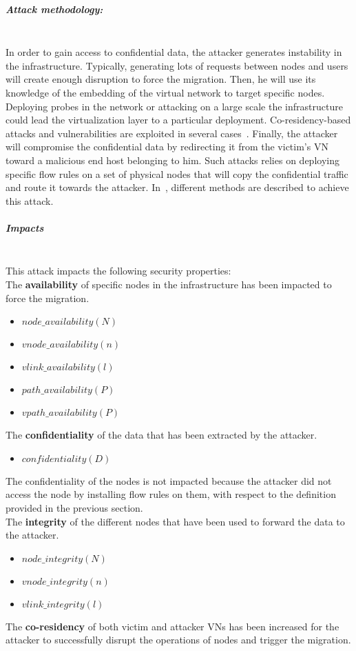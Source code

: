 \subparagraph{Attack methodology:}\textbf{\\}
In order to gain access to confidential data, the attacker generates instability in the infrastructure. Typically, generating lots of requests between nodes and users will create enough disruption to force the migration.
Then, he will use its knowledge of the embedding of the virtual network to target specific nodes.
Deploying probes in the network or attacking on a large scale the infrastructure could lead the virtualization layer to a particular deployment. Co-residency-based attacks and vulnerabilities are exploited in several cases~\cite{malicious-atya2017,nomad-Moon2015b,getoffmucloud-Ristenpart2009,stalling-atya2017}.
Finally, the attacker will compromise the confidential data by redirecting it from the victim's VN toward a malicious end host belonging to him.
Such attacks relies on deploying specific flow rules on a set of physical nodes that will copy the confidential traffic and route it towards the attacker.
In~\cite{Costa2015,Sphinx-Dhawan2015}, different methods are described to achieve this attack. 

\subparagraph{Impacts}\textbf{\\}
This attack impacts the following security properties:\\
The \textbf{availability} of specific nodes in the infrastructure has been impacted to force the migration.
\begin{itemize}
    \item $node\_availability(N)$
    \item $vnode\_availability(n)$
    \item $vlink\_availability(l)$
    \item $path\_availability(P)$
    \item $vpath\_availability(P)$
\end{itemize}
The \textbf{confidentiality} of the data that has been extracted by the attacker.\\
\begin{itemize}
    \item $confidentiality(D)$
\end{itemize}
The confidentiality of the nodes is not impacted because the attacker did not access the node by installing flow rules on them, with respect to the definition provided in the previous section.\\
The \textbf{integrity} of the different nodes that have been used to forward the data to the attacker.
    \begin{itemize}
    \item $node\_integrity(N)$
    \item $vnode\_integrity(n)$
    \item $vlink\_integrity(l)$
\end{itemize}
The \textbf{co-residency} of both victim and attacker VNs has been increased for the attacker to successfully disrupt the operations of nodes and trigger the migration.



